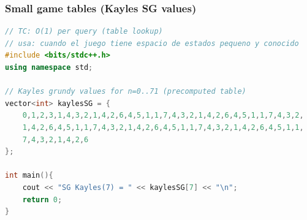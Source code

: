 \subsubsection{Small game tables (Kayles SG values)}
\begin{lstlisting}[style=mystyle, language=C++]
// TC: O(1) per query (table lookup)
// usa: cuando el juego tiene espacio de estados pequeno y conocido
#include <bits/stdc++.h>
using namespace std;

// Kayles grundy values for n=0..71 (precomputed table)
vector<int> kaylesSG = {
	0,1,2,3,1,4,3,2,1,4,2,6,4,5,1,1,7,4,3,2,1,4,2,6,4,5,1,1,7,4,3,2,
	1,4,2,6,4,5,1,1,7,4,3,2,1,4,2,6,4,5,1,1,7,4,3,2,1,4,2,6,4,5,1,1,
	7,4,3,2,1,4,2,6
};

int main(){
	cout << "SG Kayles(7) = " << kaylesSG[7] << "\n";
	return 0;
}
\end{lstlisting}
